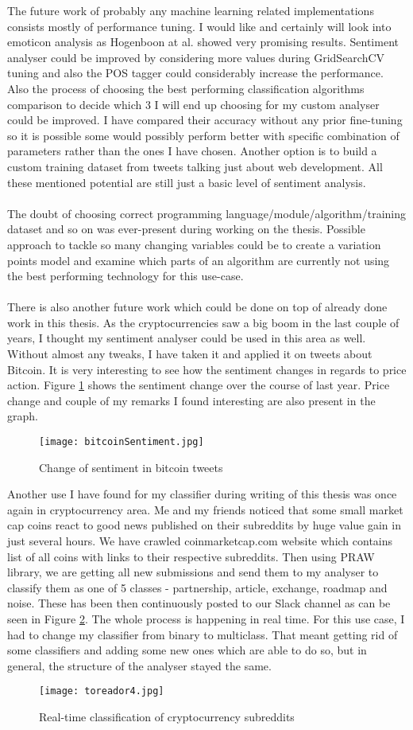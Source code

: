 The future work of probably any machine learning related implementations consists mostly of performance tuning. I would like and certainly will look into emoticon analysis as Hogenboon at al. \cite{hogenboom2013exploiting} showed very promising results. Sentiment analyser could be improved by considering more values during GridSearchCV tuning and also the POS tagger could considerably increase the performance. Also the process of choosing the best performing classification algorithms comparison to decide which 3 I will end up choosing for my custom analyser could be improved. I have compared their accuracy without any prior fine-tuning so it is possible some would possibly perform better with specific combination of parameters rather than the ones I have chosen. Another option is to build a custom training dataset from tweets talking just about web development. All these mentioned potential are still just a basic level of sentiment analysis.\\
\\
The doubt of choosing correct programming language/module/algorithm/training dataset and so on was ever-present during working on the thesis. Possible approach to tackle so many changing variables could be to create a variation points model and examine which parts of an algorithm are currently not using the best performing technology for this use-case.\\
\\
There is also another future work which could be done on top of already done work in this thesis. As the cryptocurrencies saw a big boom in the last couple of years, I thought my sentiment analyser could be used in this area as well. Without almost any tweaks, I have taken it and applied it on tweets about Bitcoin. It is very interesting to see how the sentiment changes in regards to price action. Figure \ref{fig:bitcoinSentiment} shows the sentiment change over the course of last year. Price change and couple of my remarks I found interesting are also present in the graph.

\begin{figure}[H]%
    \centering
	\texttt{[image: bitcoinSentiment.jpg]}
    \caption{Change of sentiment in bitcoin tweets}%
    \label{fig:bitcoinSentiment}%
\end{figure} 

Another use I have found for my classifier during writing of this thesis was once again in cryptocurrency area. Me and my friends noticed that some small market cap coins react to good news published on their subreddits by huge value gain in just several hours. We have crawled coinmarketcap.com website which contains list of all coins with links to their respective subreddits. Then using PRAW library, we are getting all new submissions and send them to my analyser to classify them as one of 5 classes - partnership, article, exchange, roadmap and noise. These has been then continuously posted to our Slack channel as can be seen in Figure \ref{fig:toreador}. The whole process is happening in real time. For this use case, I had to change my classifier from binary to multiclass. That meant getting rid of some classifiers and adding some new ones which are able to do so, but in general, the structure of the analyser stayed the same.

\begin{figure}[H]%
    \centering
	\texttt{[image: toreador4.jpg]}
    \caption{Real-time classification of cryptocurrency subreddits}%
    \label{fig:toreador}%
\end{figure} 

